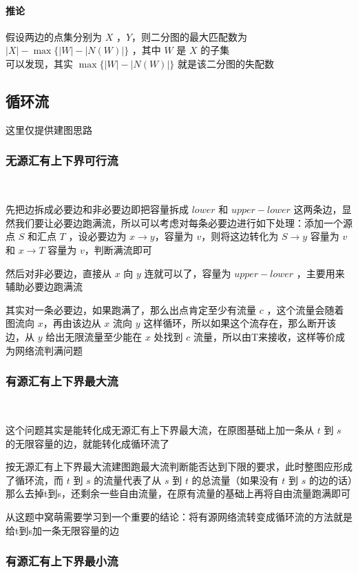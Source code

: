	\paragraph{推论}假设两边的点集分别为 $X$ ，$Y$，则二分图的最大匹配数为 $|X|−\max\{|W|−|N(W)|\}$ ，其中 $W$ 是 $X$ 的子集\\
	可以发现，其实 $\max\{|W|−|N(W)|\}$ 就是该二分图的失配数
	\newpage
	\subsection{循环流}
	这里仅提供建图思路\\
	\subsubsection{无源汇有上下界可行流}~
	
	先把边拆成必要边和非必要边即把容量拆成 $lower$ 和 $upper-lower$ 这两条边，显然我们要让必要边跑满流，所以可以考虑对每条必要边进行如下处理：添加一个源点 $S$ 和汇点 $T$ ，设必要边为 $x\rightarrow y$，容量为 $v$，则将这边转化为 $S\rightarrow y$ 容量为 $v$ 和 $x\rightarrow T$ 容量为 $v$，判断满流即可
		
	然后对非必要边，直接从 $x$ 向 $y$ 连就可以了，容量为 $upper-lower$ ，主要用来辅助必要边跑满流
	
	其实对一条必要边，如果跑满了，那么出点肯定至少有流量 $c$ ，这个流量会随着图流向 $x$，再由该边从 $x$ 流向 $y$ 这样循环，所以如果这个流存在，那么断开该边，从 $y$ 给出无限流量至少能在 $x$ 处找到 $c$ 流量，所以由T来接收，这样等价成为网络流判满问题\\
	\subsubsection{有源汇有上下界最大流}~
	
	这个问题其实是能转化成无源汇有上下界最大流，在原图基础上加一条从 $t$ 到 $s$ 的无限容量的边，就能转化成循环流了
	
	按无源汇有上下界最大流建图跑最大流判断能否达到下限的要求，此时整图应形成了循环流，而 $t$ 到 $s$ 的流量代表了从 $s$ 到 $t$ 的总流量（如果没有 $t$ 到 $s$ 的边的话）那么去掉t到s，还剩余一些自由流量，在原有流量的基础上再将自由流量跑满即可
	
	从这题中窝萌需要学习到一个重要的结论：将有源网络流转变成循环流的方法就是给t到s加一条无限容量的边\\
	\subsubsection{有源汇有上下界最小流}~
	
